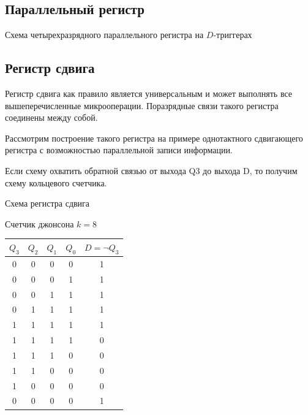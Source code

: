 \documentclass[a4paper]{article}
\begin{document}
\subsection{Параллельный регистр}
Схема четырехразрядного параллельного регистра на $D$-триггерах

\subsection{Регистр сдвига}
Регистр сдвига как правило является универсальным и может выполнять все вышеперечисленные микрооперации.
Поразрядные связи такого регистра соединены между собой.

Рассмотрим построение такого регистра на примере однотактного сдвигающего регистра с возможностью параллельной записи информации.

Если схему охватить обратной связью от выхода Q3 до выхода D, то получим схему кольцевого счетчика.



Схема регистра сдвига

Счетчик джонсона $k = 8$
\begin{table}[ht]
\centering
\begin{tabular}{|c|c|c|c|c|}
\hline
$Q_3$ & $Q_2$ & $Q_1$ & $Q_0$ & $D = \neg Q_3$ \\
\hline
0 & 0 & 0 & 0 & 1 \\
0 & 0 & 0 & 1 & 1 \\
0 & 0 & 1 & 1 & 1 \\
0 & 1 & 1 & 1 & 1 \\
1 & 1 & 1 & 1 & 1 \\
1 & 1 & 1 & 1 & 0 \\
1 & 1 & 1 & 0 & 0 \\
1 & 1 & 0 & 0 & 0 \\
1 & 0 & 0 & 0 & 0 \\
0 & 0 & 0 & 0 & 1 \\
\hline
\end{tabular}
\end{table}
\end{document}

